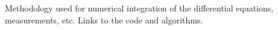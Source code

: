 \chapter{\bf {}}
\label{cha:appB}
Methodology used for numerical integration of the differential
equations, measurements, etc. Links to the code and algorithms.


